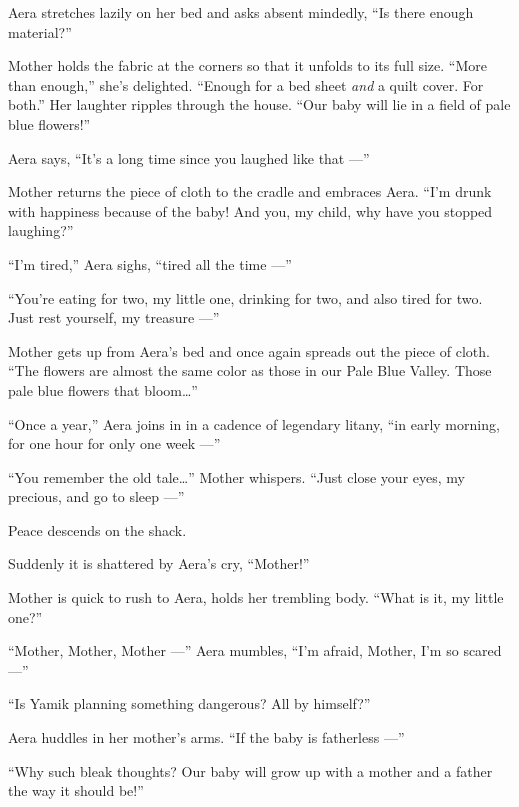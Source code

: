 \documentclass[twoside,11pt,openany]{book}
\begin{document}
Aera stretches lazily on her bed and asks absent mindedly,
``Is there enough material?''

Mother holds the fabric at the corners so that it unfolds to its full size. ``More than
enough,'' she's delighted. ``Enough for a bed sheet \textit{and} a quilt cover.  For
both.'' Her laughter ripples through the house. ``Our baby will lie in a field of pale blue
flowers!''

Aera says, ``It's a long time since you laughed like that ---''

Mother returns the piece of cloth to the cradle and embraces Aera.  ``I'm drunk with happiness because of
the baby! And you, my child, why have you stopped laughing?''

``I'm tired,'' Aera sighs, ``tired all the time ---''

``You're eating for two, my little one, drinking for two, and also tired for two. Just rest yourself, my
treasure ---''

Mother gets up from Aera's bed and once again spreads out the piece of cloth. ``The flowers are almost the
same color as those in our Pale Blue Valley.
Those pale blue flowers that bloom{\ldots}''

``Once a year,'' Aera joins in in a cadence of legendary litany,
``in early morning, for one hour for only one week ---''

``You remember the old tale{\ldots}'' Mother whispers. ``Just close your eyes, my
precious, and go to sleep ---''

Peace descends on the shack.

Suddenly it is shattered by Aera's cry, ``Mother!''

Mother is quick to rush to Aera, holds her trembling body. ``What is it, my little one?''

``Mother, Mother, Mother ---'' Aera mumbles, ``I'm afraid, Mother, I'm so scared
---''

``Is Yamik planning something dangerous? All by himself?''

Aera huddles in her mother's arms. ``If the baby is fatherless ---''

``Why such bleak thoughts? Our baby will grow up with a mother and a father the way it should
be!''


\bigskip

\chapter{}
\end{document}
